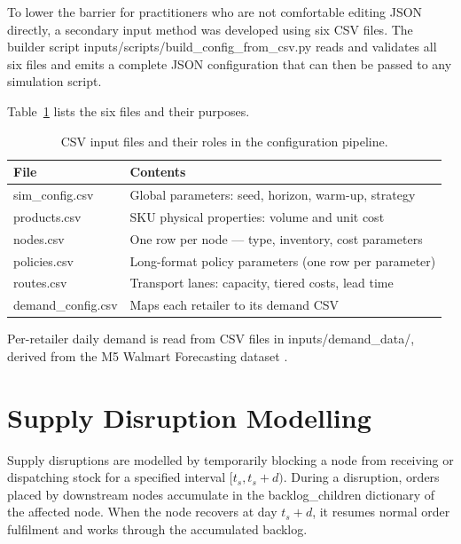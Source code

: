 To lower the barrier for practitioners who are not comfortable editing JSON
directly, a secondary input method was developed using six CSV files.  The
builder script inputs/scripts/build\_config\_from\_csv.py reads and
validates all six files and emits a complete JSON configuration that can then
be passed to any simulation script.

Table~\ref{tab:csv-files} lists the six files and their purposes.

\begin{table}[htbp]
  \centering
  \caption{CSV input files and their roles in the configuration pipeline.}
  \label{tab:csv-files}
  \begin{tabular}{@{}ll@{}}
    \toprule
    File & Contents \\
    \midrule
    sim\_config.csv    & Global parameters: seed, horizon, warm-up, strategy \\
    products.csv       & SKU physical properties: volume and unit cost \\
    nodes.csv          & One row per node — type, inventory, cost parameters \\
    policies.csv       & Long-format policy parameters (one row per parameter) \\
    routes.csv         & Transport lanes: capacity, tiered costs, lead time \\
    demand\_config.csv & Maps each retailer to its demand CSV \\
    \bottomrule
  \end{tabular}
\end{table}

Per-retailer daily demand is read from CSV files in inputs/demand\_data/,
derived from the M5 Walmart Forecasting dataset \citep{MakridakisEtAl2020}.

\section{Supply Disruption Modelling}
\label{sec:arch:disruptions}

Supply disruptions are modelled by temporarily blocking a node from
receiving or dispatching stock for a specified interval $[t_s, t_s+d)$.
During a disruption, orders placed by downstream nodes accumulate in the
backlog\_children dictionary of the affected node.  When the node
recovers at day $t_s + d$, it resumes normal order fulfilment and works
through the accumulated backlog.

